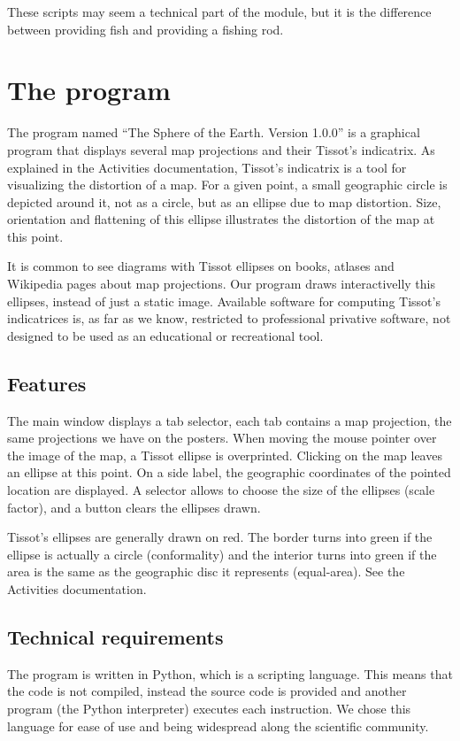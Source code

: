 \documentclass[a4paper,12pt]{article}
\begin{document}
These scripts may seem a technical part of the module, but it is the difference between providing fish and providing a fishing rod.


\section{The program}
The program named ``The Sphere of the Earth. Version 1.0.0'' is a graphical program that displays several map projections and their
Tissot's indicatrix. As explained in the Activities documentation, Tissot's indicatrix is a tool for visualizing the distortion of a map.
For a given point, a small geographic circle is depicted around it, not as a circle, but as an ellipse due to map distortion. Size,
orientation and flattening of this ellipse illustrates the distortion of the map at this point.

It is common to see diagrams with Tissot ellipses on books, atlases and Wikipedia pages about map projections. Our program draws
interactivelly this ellipses, instead of just a static image. Available software for computing Tissot's indicatrices is, as far as we know,
restricted to professional privative software, not designed to be used as an educational or recreational tool.

\subsection{Features}
The main window displays a tab selector, each tab contains a map projection, the same projections we have on the posters. When moving
the mouse pointer over the image of the map, a Tissot ellipse is overprinted. Clicking on the map leaves an ellipse at this point. On a
side label, the geographic coordinates of the pointed location are displayed. A selector allows to choose the size of the ellipses (scale
factor), and a button clears the ellipses drawn.

Tissot's ellipses are generally drawn on red. The border turns into green if the ellipse is actually a circle (conformality) and the
interior turns into green if the area is the same as the geographic disc it represents (equal-area). See the Activities documentation.

\subsection{Technical requirements}

The program is written in Python, which is a scripting language. This means that the code is not compiled, instead the source code is
provided and another program (the Python interpreter) executes each instruction. We chose this language for ease of use and being widespread
along the scientific community.
\end{document}
